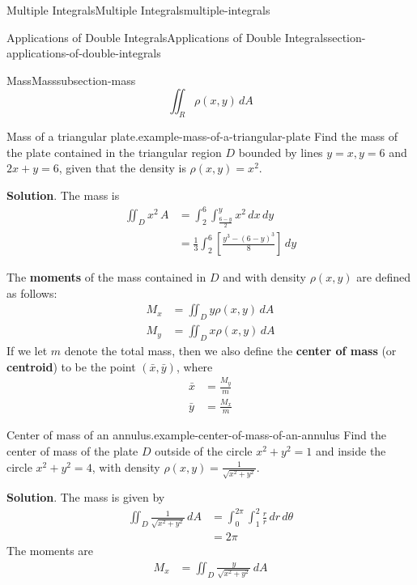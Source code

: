 \documentclass[oneside,10pt,]{book}
\newcommand{\terminology}[1]{\textbf{#1}}
\numberwithin{equation}{section}
\begin{document}
\begin{chapterptx}{Multiple Integrals}{}{Multiple Integrals}{}{}{multiple-integrals}
\begin{sectionptx}{Applications of Double Integrals}{}{Applications of Double Integrals}{}{}{section-applications-of-double-integrals}
\begin{subsectionptx}{Mass}{}{Mass}{}{}{subsection-mass}
\begin{equation*}
\iint_{R}\rho(x,y)\,dA
\end{equation*}
%
\begin{example}{Mass of a triangular plate.}{example-mass-of-a-triangular-plate}%
\hypertarget{p-1501}{}%
Find the mass of the plate contained in the triangular region \(D\) bounded by lines \(y=x, y = 6\) and \(2x+y = 6\), given that the density is \(\rho(x,y) = x^{2}\).%
\par\smallskip%
\noindent\textbf{Solution}.\hypertarget{solution-246}{}\quad%
\hypertarget{p-1502}{}%
The mass is%
\begin{align*}
\iint_{D}x^{2}\,A & =  \int_{2}^{6}\int_{\frac{6-y}{2}}^{y}x^{2}\,dx\,dy\\
& = \frac{1}{3}\int_{2}^{6}\left[\frac{y^{3} - (6-y)^{3}}{8}\right]\,dy 
\end{align*}
%
\end{example}
\hypertarget{p-1503}{}%
The \terminology{moments} of the mass contained in \(D\) and with density \(\rho(x,y)\) are defined as follows:%
\begin{align*}
M_{x} & = \iint_{D}y\rho(x,y)\,dA \\
M_{y} & = \iint_{D}x\rho(x,y)\,dA 
\end{align*}
If we let \(m\) denote the total mass, then we also define the \terminology{center of mass} (or \terminology{centroid}) to be the point \((\bar{x},\bar{y})\), where%
\begin{align*}
\bar{x} & = \frac{M_{y}}{m} \\
\bar{y} & = \frac{M_{x}}{m} 
\end{align*}
%
\begin{example}{Center of mass of an annulus.}{example-center-of-mass-of-an-annulus}%
\hypertarget{p-1504}{}%
Find the center of mass of the plate \(D\) outside of the circle \(x^{2}+y^{2} = 1\) and inside the circle \(x^{2} + y^{2} = 4\), with density \(\rho(x,y) = \frac{1}{\sqrt{x^{2} + y^{2}}}\).%
\par\smallskip%
\noindent\textbf{Solution}.\hypertarget{solution-247}{}\quad%
\hypertarget{p-1505}{}%
The mass is given by%
\begin{align*}
\iint_{D} \frac{1}{\sqrt{x^{2}+y^{2}}}\,dA & = \int_{0}^{2\pi}\int_{1}^{2}\frac{r}{r}\,dr\,d\theta \\
& = 2\pi 
\end{align*}
The moments are%
\begin{align*}
M_{x} & = \iint_{D}\frac{y}{\sqrt{x^{2} + y^{2}}}\,dA \\

\end{align*}
\end{example}
\end{subsectionptx}
\end{sectionptx}
\end{chapterptx}
\end{document}
